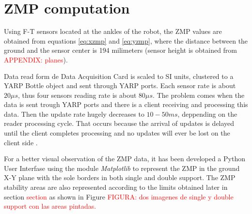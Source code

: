 \section{ZMP computation}
Using F-T sensors located at the ankles of the robot, the ZMP values are obtained from equations \eqref{eq:xzmp} and \eqref{eq:yzmp}, where the distance between the ground and the sensor center is 194 milimeters (sensor height is obtained from \textcolor{red}{APPENDIX: planes}).

Data read form de Data Acquisition Card is scaled to SI units, clustered to a YARP Bottle object and sent through YARP ports. Each sensor rate is about $20 \mu s$, thus four sensors reading rate is about $80 \mu s$. The problem comes when the data is sent trough YARP ports and there is a client receiving and processing this data. Then the update rate hugely decreases to $10 - 50 ms$, deppending on the reader processing cycle. That occurs because the arrival of updates is delayed until the client completes processing and no updates will ever be lost on the client side \cite{Yarp2006}.

For a better visual observation of the ZMP data, it has been developed a  Python User Interfase using the module \textit{Matplotlib} to represent the ZMP in the ground X-Y plane with the sole borders in both single and double support. The ZMP stability areas are also represented according to the limits obtained later in section \textcolor{red}{section} as shown in Figure \textcolor{red}{FIGURA: dos imagenes de single y double support con las areas pintadas.}